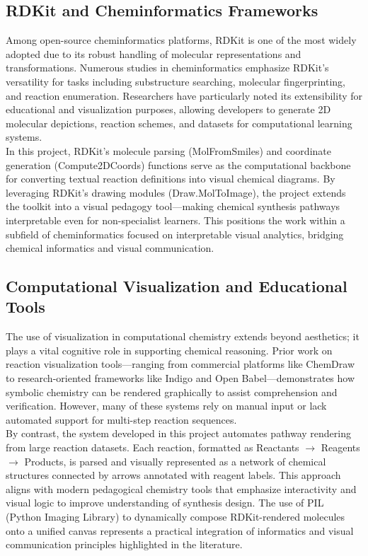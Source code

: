 \documentclass[12pt]{article}
\begin{document}
\subsection{RDKit and Cheminformatics Frameworks}
\indent
Among open-source cheminformatics platforms, RDKit is one of the most widely adopted due to its robust handling of molecular representations and transformations. 
Numerous studies in cheminformatics emphasize RDKit’s versatility for tasks including substructure searching, molecular fingerprinting, and reaction enumeration.
Researchers have particularly noted its extensibility for educational and visualization purposes, allowing developers to generate 2D molecular depictions, reaction schemes, and datasets for computational learning systems.
\\
In this project, RDKit’s molecule parsing (MolFromSmiles) and coordinate generation (Compute2DCoords) functions serve as the computational backbone for converting textual reaction definitions into visual chemical diagrams.
By leveraging RDKit’s drawing modules (Draw.MolToImage), the project extends the toolkit into a visual pedagogy tool—making chemical synthesis pathways interpretable even for non-specialist learners.
This positions the work within a subfield of cheminformatics focused on interpretable visual analytics, bridging chemical informatics and visual communication.
\\
\subsection{Computational Visualization and Educational Tools}

\noindent
The use of visualization in computational chemistry extends beyond aesthetics; it plays a vital cognitive role in supporting chemical reasoning.
Prior work on reaction visualization tools—ranging from commercial platforms like ChemDraw to research-oriented frameworks like Indigo and Open Babel—demonstrates how symbolic chemistry can be rendered graphically to assist comprehension and verification.
However, many of these systems rely on manual input or lack automated support for multi-step reaction sequences.
\\
\indent
By contrast, the system developed in this project automates pathway rendering from large reaction datasets. 
Each reaction, formatted as Reactants $\rightarrow$ Reagents $\rightarrow$ Products, is parsed and visually represented as a network of chemical structures connected by arrows annotated with reagent labels.
This approach aligns with modern pedagogical chemistry tools that emphasize interactivity and visual logic to improve understanding of synthesis design.
The use of PIL (Python Imaging Library) to dynamically compose RDKit-rendered molecules onto a unified canvas represents a practical integration of informatics and visual communication principles highlighted in the literature.
\\
\end{document}
